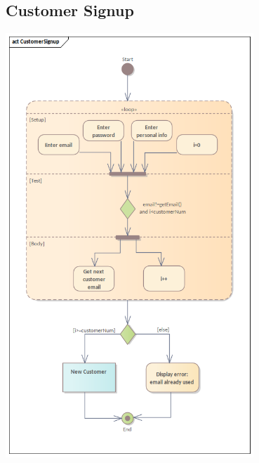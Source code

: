 \subsection{Customer Signup}
\begin{center}
  \includegraphics[width=0.7\textwidth]{immagini/Analisi/ActivityDiagrams/CustomerSignup.png}
\end{center}

